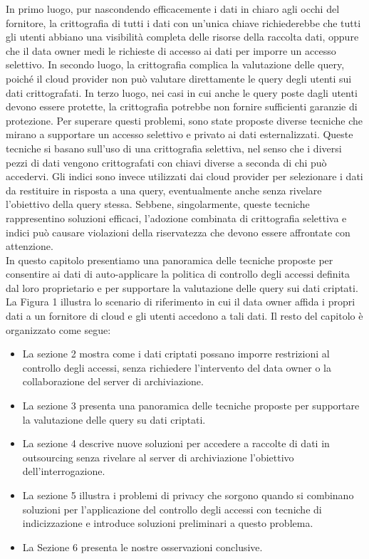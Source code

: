 In primo luogo, pur nascondendo efficacemente i dati in chiaro agli occhi del fornitore, la crittografia di tutti i dati con un'unica chiave richiederebbe che tutti gli utenti abbiano una visibilità completa delle risorse della raccolta dati, oppure che il data owner medi le richieste di accesso ai dati per imporre un accesso selettivo. In secondo luogo, la crittografia complica la valutazione delle query, poiché il cloud provider non può valutare direttamente le query degli utenti sui dati crittografati. In terzo luogo, nei casi in cui anche le query poste dagli utenti devono essere protette, la crittografia potrebbe non fornire sufficienti garanzie di protezione. Per superare questi problemi, sono state proposte diverse tecniche che mirano a supportare un accesso selettivo e privato ai dati esternalizzati. Queste tecniche si basano sull'uso di una crittografia selettiva, nel senso che i diversi pezzi di dati vengono crittografati con chiavi diverse a seconda di chi può accedervi. Gli indici sono invece utilizzati dai cloud provider per selezionare i dati da restituire in risposta a una query, eventualmente anche senza rivelare l'obiettivo della query stessa. Sebbene, singolarmente, queste tecniche rappresentino soluzioni efficaci, l'adozione combinata di crittografia selettiva e indici può causare violazioni della riservatezza che devono essere affrontate con attenzione.
\\
\newline
In questo capitolo presentiamo una panoramica delle tecniche proposte per consentire ai dati di auto-applicare la politica di controllo degli accessi definita dal loro proprietario e per supportare la valutazione delle query sui dati criptati. La Figura 1 illustra lo scenario di riferimento in cui il data owner affida i propri dati a un fornitore di cloud e gli utenti accedono a tali dati.
Il resto del capitolo è organizzato come segue: 
\begin{itemize}
    \item La sezione 2 mostra come i dati criptati possano imporre restrizioni al controllo degli accessi, senza richiedere l'intervento del data owner o la collaborazione del server di archiviazione.
    \item La sezione 3 presenta una panoramica delle tecniche proposte per supportare la valutazione delle query su dati criptati.
    \item La sezione 4 descrive nuove soluzioni per accedere a raccolte di dati in outsourcing senza rivelare al server di archiviazione l'obiettivo dell'interrogazione.
    \item La sezione 5 illustra i problemi di privacy che sorgono quando si combinano soluzioni per l'applicazione del controllo degli accessi con tecniche di indicizzazione e introduce soluzioni preliminari a questo problema.
    \item La Sezione 6 presenta le nostre osservazioni conclusive.
\end{itemize}

